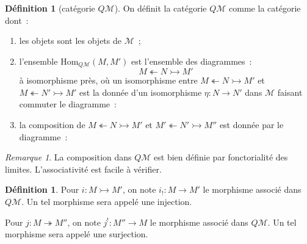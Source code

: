 \documentclass{amsart}
\theoremstyle{plain}
\theoremstyle{definition}
\newtheorem{defi}[theo]{Définition}
\theoremstyle{remark}
\newtheorem{rem}[theo]{Remarque}
\newcommand{\M}{\mathcal{M}}
\newcommand{\Hom}[3]{\mathrm{Hom}_{#1}(#2,#3)}
\newcommand{\ra}{\rightarrow}
\begin{document}
\begin{defi}[catégorie $Q\M$]
  On définit la catégorie $Q\M$ comme la catégorie dont~:
  \begin{enumerate}
    \item les objets sont les objets de $\M$~;
    \item l'ensemble $\Hom{Q\M}{M}{M'}$ est l'ensemble des diagrammes~:
          $$M\twoheadleftarrow N \rightarrowtail M'$$
          à isomorphisme près, où un isomorphisme entre $M\twoheadleftarrow N \rightarrowtail M'$ et $M\twoheadleftarrow N' \rightarrowtail M'$
          est la donnée d'un isomorphisme $\eta:N\ra N'$ dans $\M$ faisant commuter le diagramme~:
          \begin{center}
          \end{center}
    \item la composition de $M\twoheadleftarrow N \rightarrowtail M'$ et $M'\twoheadleftarrow N' \rightarrowtail M''$ est donnée par le diagramme~:
    \begin{center}
    \end{center}
  \end{enumerate}
\end{defi}

\begin{rem}
  La composition dans $Q\M$ est bien définie par fonctorialité des limites. L'associativité est facile à vérifier.
\end{rem}

\begin{defi}
  Pour $i:M\rightarrowtail M'$, on note $i_!:M\ra M'$ le morphisme associé dans $Q\M$. Un tel morphisme sera appelé une injection.

  Pour $j:M\twoheadrightarrow M''$, on note $j^!:M''\ra M$ le morphisme associé dans $Q\M$. Un tel morphisme sera appelé une surjection.
\end{defi}
\end{document}
